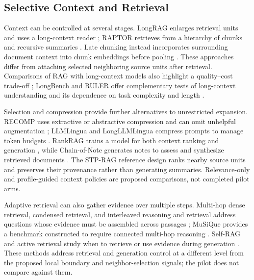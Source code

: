 \documentclass[10pt]{article}
\begin{document}
\subsection{Selective Context and Retrieval}

Context can be controlled at several stages. LongRAG enlarges retrieval units and uses a long-context reader \cite{Jiang2024LongragEnhancing}; RAPTOR retrieves from a hierarchy of chunks and recursive summaries \cite{Sarthi2024RaptorRecursive}. Late chunking instead incorporates surrounding document context into chunk embeddings before pooling \cite{Gunther2024LateChunking}. These approaches differ from attaching selected neighboring source units after retrieval. Comparisons of RAG with long-context models also highlight a quality--cost trade-off \cite{Li2024RetrievalAugmented}; LongBench and RULER offer complementary tests of long-context understanding and its dependence on task complexity and length \cite{Bai2023LongbenchBilingual,Hsieh2024RulerWhats}.

Selection and compression provide further alternatives to unrestricted expansion. RECOMP uses extractive or abstractive compression and can omit unhelpful augmentation \cite{Xu2023RecompImproving}; LLMLingua and LongLLMLingua compress prompts to manage token budgets \cite{Jiang2023LlmlinguaCompressing,Jiang2023LongllmlinguaAccelerating}. RankRAG trains a model for both context ranking and generation \cite{Yu2024RankragUnifying}, while Chain-of-Note generates notes to assess and synthesize retrieved documents \cite{Yu2023ChainofnoteEnhancing}. The STP-RAG reference design ranks nearby source units and preserves their provenance rather than generating summaries. Relevance-only and profile-guided context policies are proposed comparisons, not completed pilot arms.

Adaptive retrieval can also gather evidence over multiple steps. Multi-hop dense retrieval, condensed retrieval, and interleaved reasoning and retrieval address questions whose evidence must be assembled across passages \cite{Xiong2020AnsweringComplex,Khattab2021BaleenRobust,Trivedi2022InterleavingRetrieval}; MuSiQue provides a benchmark constructed to require connected multi-hop reasoning \cite{Trivedi2021MusiqueMultihop}. Self-RAG and active retrieval study when to retrieve or use evidence during generation \cite{Asai2023SelfragLearning,Jiang2023ActiveRetrieval}. These methods address retrieval and generation control at a different level from the proposed local boundary and neighbor-selection signals; the pilot does not compare against them.
\end{document}
